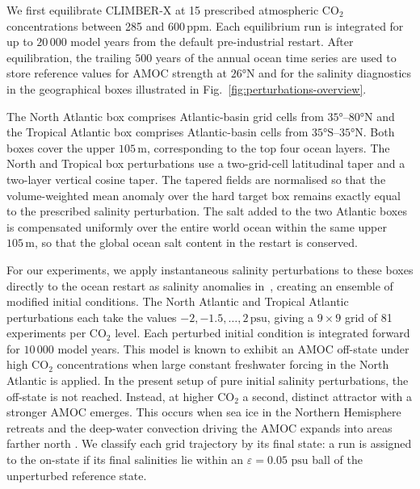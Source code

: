 \documentclass[12pt, a4paper]{article}
\newcommand{\psu}{\,\text{psu}}
\newcommand{\CO}{CO\ensuremath{_2}}
\begin{document}
We first equilibrate CLIMBER-X at 15 prescribed atmospheric \CO{} concentrations between 285 and $600\,\text{ppm}$. Each equilibrium run is integrated for up to $20\,000$ model years from the default pre-industrial restart. After equilibration, the trailing $500$ years of the annual ocean time series are used to store reference values for AMOC strength at $26°\text{N}$ and for the salinity diagnostics in the geographical boxes illustrated in Fig.~\ref{fig:perturbations-overview}.

The North Atlantic box comprises Atlantic-basin grid cells from $35°$--$80°\text{N}$ and the Tropical Atlantic box comprises Atlantic-basin cells from $35°\text{S}$--$35°\text{N}$. Both boxes cover the upper $105\,\text{m}$, corresponding to the top four ocean layers. The North and Tropical box perturbations use a two-grid-cell latitudinal taper and a two-layer vertical cosine taper. The tapered fields are normalised so that the volume-weighted mean anomaly over the hard target box remains exactly equal to the prescribed salinity perturbation. The salt added to the two Atlantic boxes is compensated uniformly over the entire world ocean within the same upper $105\,\text{m}$, so that the global ocean salt content in the restart is conserved. 

For our experiments, we apply instantaneous salinity perturbations to these boxes directly to the ocean restart as salinity anomalies in \psu{}, creating an ensemble of modified initial conditions. The North Atlantic and Tropical Atlantic perturbations each take the values $-2,-1.5,\ldots,2\psu{}$, giving a $9\times9$ grid of 81 experiments per \CO{} level. Each perturbed initial condition is integrated forward for $10\,000$ model years. This model is known to exhibit an AMOC off-state under high \CO{} concentrations when large constant freshwater forcing in the North Atlantic is applied. In the present setup of pure initial salinity perturbations, the off-state is not reached. Instead, at higher \CO{} a second, distinct attractor with a stronger AMOC emerges. This occurs when sea ice in the Northern Hemisphere retreats and the deep-water convection driving the AMOC expands into areas farther north \citep{Willeit2024GeneralizedStabilityLandscape}. We classify each grid trajectory by its final state: a run is assigned to the on-state if its final salinities lie within an $\varepsilon=0.05\,\psu{}$ ball of the unperturbed reference state.
\end{document}
